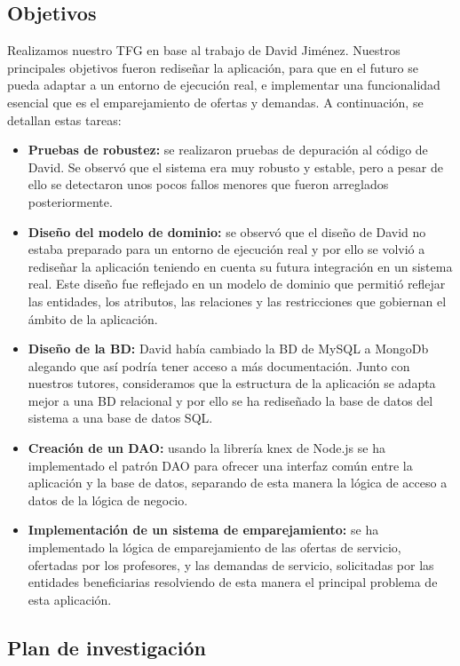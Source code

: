 \documentclass{article}
\begin{document}
\subsection{Objetivos}
Realizamos nuestro TFG en base al trabajo de David Jiménez.
Nuestros principales objetivos fueron rediseñar la aplicación, para que en el futuro se pueda adaptar a un entorno de ejecución real, e implementar una funcionalidad esencial que es el emparejamiento de ofertas y demandas.
A continuación, se detallan estas tareas:
\begin{itemize}
\item \textbf{Pruebas de robustez:} se realizaron pruebas de depuración al código de David. Se observó que el sistema era muy robusto y estable, pero a pesar de ello se detectaron unos pocos fallos menores que fueron arreglados posteriormente.
\item \textbf{Diseño del modelo de dominio:} se observó que el diseño de David no estaba preparado para un entorno de ejecución real y por ello se volvió a rediseñar la aplicación teniendo en cuenta su futura integración en un sistema real. Este diseño fue reflejado en un modelo de dominio que permitió reflejar las entidades, los atributos, las relaciones y las restricciones que gobiernan el ámbito de la aplicación.
\item \textbf{Diseño de la BD:} David había cambiado la BD de MySQL a MongoDb alegando que así podría tener acceso a más documentación. Junto con nuestros tutores, consideramos que la estructura de la aplicación se adapta mejor a una BD relacional y por ello se ha rediseñado la base de datos del sistema a una base de datos SQL.
\item \textbf{Creación de un DAO:} usando la librería knex de Node.js se ha implementado el patrón DAO para ofrecer una interfaz común entre la aplicación y la base de datos, separando de esta manera la lógica de acceso a datos de la lógica de negocio.
\item \textbf{Implementación de un sistema de emparejamiento:} se ha implementado la lógica de emparejamiento de las ofertas de servicio, ofertadas por los profesores, y las demandas de servicio, solicitadas por las entidades beneficiarias resolviendo de esta manera el principal problema de esta aplicación.
\end{itemize}

\subsection{Plan de investigación}
\end{document}
